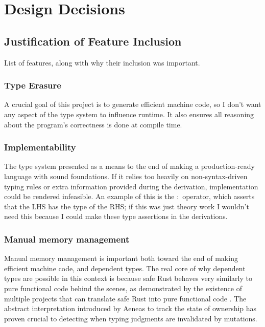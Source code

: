 \documentclass[12pt,twoside]{report}
\begin{document}
\FloatBarrier

\section{Design Decisions}
\label{section:designdecisions}

\subsection{Justification of Feature Inclusion}
List of features, along with why their inclusion was important.

\subsubsection{Type Erasure}
A crucial goal of this project is to generate efficient machine code, so I don't want any aspect of the type system to influence runtime. It also ensures all reasoning about the program's correctness is done at compile time.

\subsubsection{Implementability}
The type system presented as a means to the end of making a production-ready language with sound foundations. If it relies too heavily on non-syntax-driven typing rules or extra information provided during the derivation, implementation could be rendered infeasible. An example of this is the $:$ operator, which asserts that the LHS has the type of the RHS; if this was just theory work I wouldn't need this because I could make these type assertions in the derivations.

\subsubsection{Manual memory management}
Manual memory management is important both toward the end of making efficient machine code, and dependent types. The real core of why dependent types are possible in this context is because safe Rust behaves very similarly to pure functional code behind the scenes, as demonstrated by the existence of multiple projects that can translate safe Rust into pure functional code \citep{aeneas}\citep{ullrichKhaElectrolysis2024}. The abstract interpretation introduced by Aeneas to track the state of ownership has proven crucial to detecting when typing judgments are invalidated by mutations.
\end{document}
